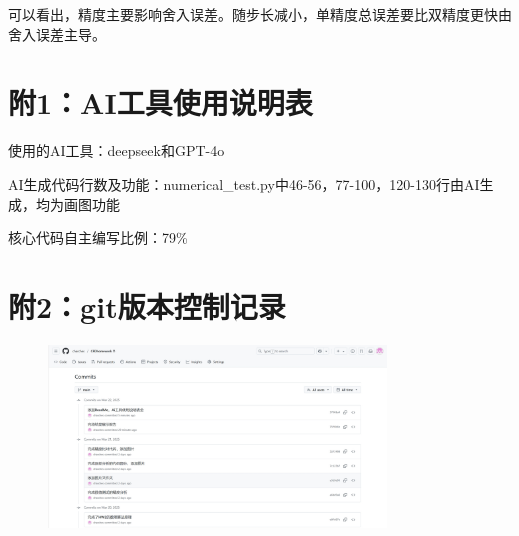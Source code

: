 \documentclass[12pt, a4paper]{article}
\begin{document}
可以看出，精度主要影响舍入误差。随步长减小，单精度总误差要比双精度更快由舍入误差主导。

\section*{附1：AI工具使用说明表}
使用的AI工具：deepseek和GPT-4o

AI生成代码行数及功能：numerical\_test.py中46-56，77-100，120-130行由AI生成，均为画图功能

核心代码自主编写比例：79\%

\section*{附2：git版本控制记录}
\begin{figure}[htbp]
    \includegraphics[width=0.8\textwidth]{./pictures/git_control.png}
\end{figure}
\end{document}
